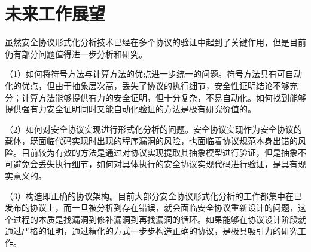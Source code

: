 

\section{未来工作展望}

虽然安全协议形式化分析技术已经在多个协议的验证中起到了关键作用，但是目前仍有部分问题值得进一步分析和研究。

（1）如何将符号方法与计算方法的优点进一步统一的问题。符号方法具有可自动化的优点，但由于抽象层次高，丢失了协议的执行细节，安全性证明结论不够充分；计算方法能够提供有力的安全证明，但十分复杂，不易自动化。如何找到能够提供强有力安全证明同时又能自动化验证的方法是极有研究价值的。

（2）如何对安全协议实现进行形式化分析的问题。安全协议实现作为安全协议的载体，既面临代码实现时出现的程序漏洞的风险，也面临着协议规范本身出错的风险。目前较为有效的方法是通过对协议实现提取其抽象模型进行验证，但是抽象不可避免会丢失执行细节，如何对具体执行的安全协议实现代码进行验证，是具有现实意义的。

（3）构造即正确的协议架构。目前大部分安全协议形式化分析的工作都集中在已发布的协议上，而一旦被分析到存在错误，就会面临安全协议重新设计的问题，这个过程的本质是找漏洞到修补漏洞到再找漏洞的循环。如果能够在协议设计阶段就通过严格的证明，通过精化的方式一步步构造正确的协议，是极具吸引力的研究工作。
